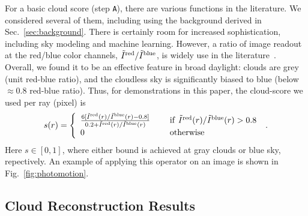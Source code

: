 \documentclass[runningheads]{llncs}
\begin{document}
For a basic cloud score (step {\tt A}), there are various functions in the literature. We considered several of them, including using the background derived in Sec.~\ref{sec:background}. There is certainly room for increased sophistication, including sky modeling and machine learning. However,
a ratio of image readout at the red/blue color channels, $\tilde I^{\rm red}/\tilde I^{\rm blue}$, is widely use in the literature~\cite{Yamashita2004,Seiz2002}. Overall, we found it to be an effective feature in broad daylight: clouds are grey (unit red-blue ratio), and the cloudless sky is significantly biased to blue
(below $\approx 0.8$ red-blue ratio). Thus, for demonstrations in this paper,
the cloud-score we used per ray (pixel) is
\begin{equation}
 s(r)=\left\{
      \begin{array}{ll}
      \frac{6 [\tilde I^{\rm red}(r)/\tilde I^{\rm blue}(r)-0.8]}
           {0.2+\tilde I^{\rm red}(r)/\tilde I^{\rm blue}(r)}
      & ~~~~{\rm if}~ \tilde I^{\rm red}(r)/\tilde I^{\rm blue}(r)>0.8 \\
      0
      & ~~~~{\rm otherwise}
      \end{array}
      \right.
  \;.
 \label{eq:sr}
\end{equation}
Here $s\in[0,1]$, where either bound is achieved at gray clouds or blue sky, repectively. An example of applying this operator on an image is shown in Fig.~\ref{fig:photomotion}.


\subsection*{Cloud Reconstruction Results}
\label{sec:results}
\end{document}

